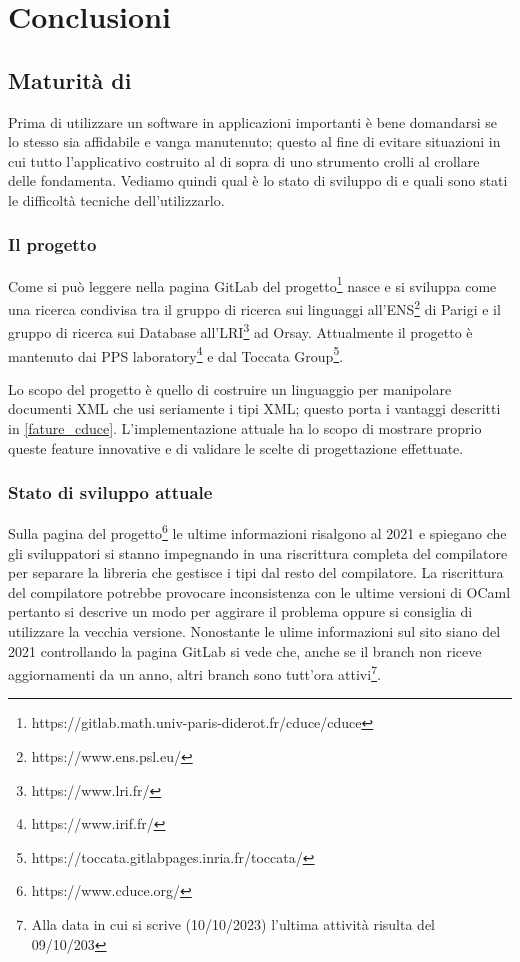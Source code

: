 \chapter{Conclusioni}
\section{Maturità di \cduce}
Prima di utilizzare un software in applicazioni importanti è bene domandarsi se lo stesso sia affidabile e vanga manutenuto; questo al fine di evitare situazioni in cui tutto l'applicativo costruito al di sopra di uno strumento crolli al crollare delle fondamenta. Vediamo quindi qual è lo stato di sviluppo di \cduce e quali sono stati le difficoltà tecniche dell'utilizzarlo.
\subsection{Il progetto \cduce}
Come si può leggere nella pagina GitLab del progetto\footnote{https://gitlab.math.univ-paris-diderot.fr/cduce/cduce} \cduce nasce e si sviluppa come una ricerca condivisa tra il gruppo di ricerca sui linguaggi all'ENS\footnote{https://www.ens.psl.eu/} di Parigi e il gruppo di ricerca sui Database all'LRI\footnote{https://www.lri.fr/} ad Orsay. Attualmente il progetto è mantenuto dai PPS laboratory\footnote{https://www.irif.fr/} e dal  Toccata Group\footnote{https://toccata.gitlabpages.inria.fr/toccata/}.

Lo scopo del progetto è quello di costruire un linguaggio per manipolare documenti XML che usi seriamente i tipi XML; questo porta i vantaggi descritti in \ref{fature_cduce}. L'implementazione attuale ha lo scopo di mostrare proprio queste feature innovative e di validare le scelte di progettazione effettuate.
\subsection{Stato di sviluppo attuale}
Sulla pagina del progetto\footnote{https://www.cduce.org/} le ultime informazioni risalgono al 2021 e spiegano che gli sviluppatori si stanno impegnando in una riscrittura completa del compilatore per separare la libreria che gestisce i tipi dal resto del compilatore. La riscrittura del compilatore potrebbe provocare inconsistenza con le ultime versioni di OCaml pertanto si descrive un modo per aggirare il problema oppure si consiglia di utilizzare la vecchia versione. Nonostante le ulime informazioni sul sito siano del 2021 controllando la pagina GitLab si vede che, anche se il branch  non riceve aggiornamenti da un anno, altri branch sono tutt'ora attivi\footnote{Alla data in cui si scrive (10/10/2023) l'ultima attività risulta del 09/10/203}.
